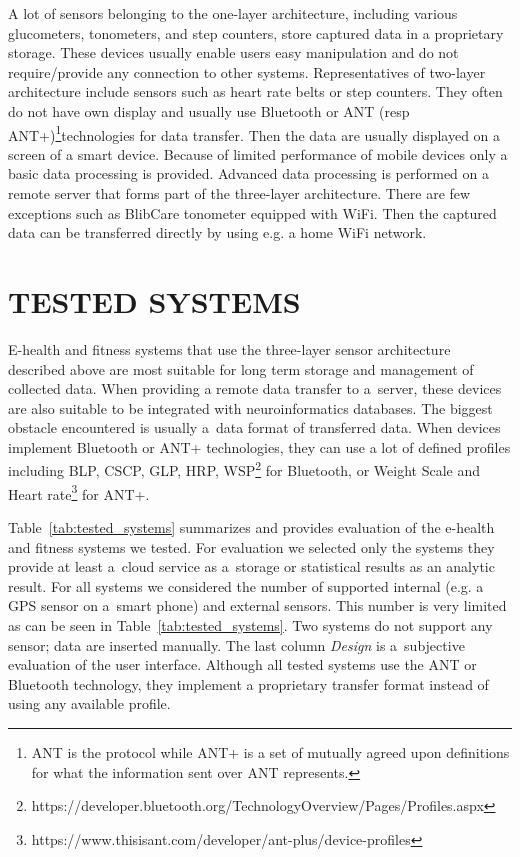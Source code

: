 \documentclass[a4paper,twoside]{article}
\begin{document}
 A lot of sensors belonging to the one-layer architecture, including various glucometers, tonometers, and step counters, store captured data in a proprietary storage. These devices usually enable users easy manipulation and do not require/provide any connection to other systems. Representatives of two-layer architecture include sensors such as heart rate belts or  step counters. They often do not have own display and usually use Bluetooth or ANT (resp ANT+)\footnote{ANT is the protocol while ANT+ is a set of mutually agreed upon definitions for what the information sent over ANT represents.}technologies  for data transfer. Then the data are usually displayed on a screen of a smart device. Because of limited performance of mobile devices only a basic data processing is provided. Advanced data processing is performed on a remote server that forms part of the three-layer architecture. There are few exceptions such as BlibCare tonometer equipped with WiFi. Then the captured data can be transferred directly by using e.g. a home WiFi network.


\section{\uppercase{Tested systems}}
\label{tested_systems}
\noindent
 
 E-health and fitness systems that use the three-layer sensor architecture described above are most suitable for long term storage and management of collected data. When providing a remote data transfer to a~server, these devices are also suitable to be integrated with neuroinformatics databases. The biggest obstacle encountered is usually a~data format of transferred data. When devices implement Bluetooth or ANT+ technologies, they can use a lot of defined profiles including BLP, CSCP, GLP, HRP, WSP\footnote{https://developer.bluetooth.org/TechnologyOverview/Pages/Profiles.aspx} for Bluetooth, or Weight Scale and Heart rate\footnote{https://www.thisisant.com/developer/ant-plus/device-profiles} for ANT+.
 
 Table~\ref{tab:tested_systems} summarizes and provides evaluation of the e-health and fitness systems we tested. For evaluation we selected only the systems they provide at least a~cloud service as a~storage or statistical results as an analytic result. For all systems we considered the number of supported internal (e.g. a GPS sensor on a~smart phone) and external sensors. This number is very limited as can be seen in Table~\ref{tab:tested_systems}. Two systems do not support any sensor; data are inserted manually. The last column \emph{Design} is a~subjective evaluation of the user interface. Although all tested systems use the ANT or Bluetooth technology, they implement a proprietary transfer format instead of using any available profile.
\end{document}

